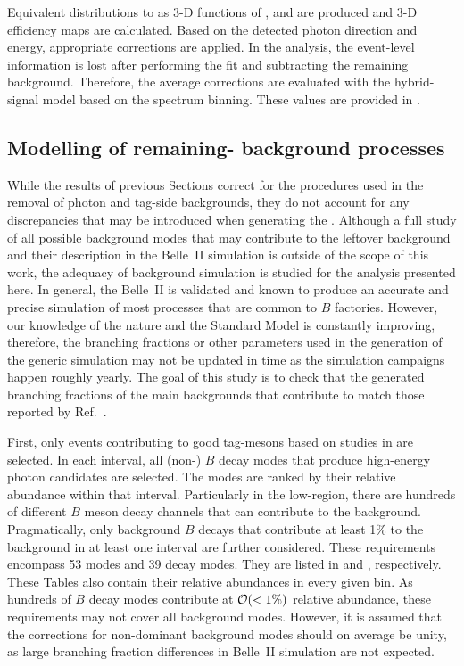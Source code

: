 Equivalent distributions to  as 3-D functions of \pRecoil, \pRecoilPhi and \pRecoilTheta are produced and 3-D efficiency maps are calculated.
Based on the detected photon direction and energy, appropriate corrections are applied.
In the \BtoXsgamma analysis, the event-level information is lost after performing the \Mbc fit and subtracting the remaining \BB background.
Therefore, the average corrections are evaluated with the \BtoXsgamma hybrid-signal model based on the \EB spectrum binning.
These values are provided in .

\subsection{Modelling of remaining-\texorpdfstring{\BB}{BB} background processes}\label{sec:remaining_bb_background_modelling}

While the results of previous Sections correct for the procedures used in the removal of photon and tag-side backgrounds, they do not account for any discrepancies that may be introduced when generating the \MC.
Although a full study of all possible background modes that may contribute to the leftover \BB background and their description in the Belle~II simulation is outside of the scope of this work, 
the adequacy of background simulation is studied for the analysis presented here.
In general, the Belle~II \MC is validated and known to produce an accurate and precise simulation of most processes that are common to $B$ factories.
However, our knowledge of the nature and the Standard Model is constantly improving, therefore, the branching fractions or other parameters used in the generation of the generic \BB simulation may not be updated in time as the simulation campaigns happen roughly yearly.
The goal of this study is to check that the generated branching fractions of the main backgrounds that contribute to \BtoXsgamma match those reported by Ref.~\cite{Workman:2022ynf}.

First, only events contributing to good tag-\B mesons based on studies in  are selected.
In each \EB interval, all (non-\BtoXsgamma) $B$ decay modes that produce high-energy photon candidates are selected.
The modes are ranked by their relative abundance within that \EB interval.
Particularly in the low-\EB region, there are hundreds of different $B$ meson decay channels that can contribute to the background.
Pragmatically, only background $B$ decays that contribute at least 1\% to the background in at least one \EB interval are further considered.
These requirements encompass 53 \Bp modes and 39 \Bz decay modes. 
They are listed in  and , respectively.
These Tables also contain their relative abundances in every given bin.
As hundreds of $B$ decay modes contribute at ${\cal O}(<1\%)$ relative abundance, these requirements may not cover all background modes. 
However, it is assumed that the corrections for non-dominant background modes should on average be unity, as large branching fraction differences in Belle~II simulation are not expected.

